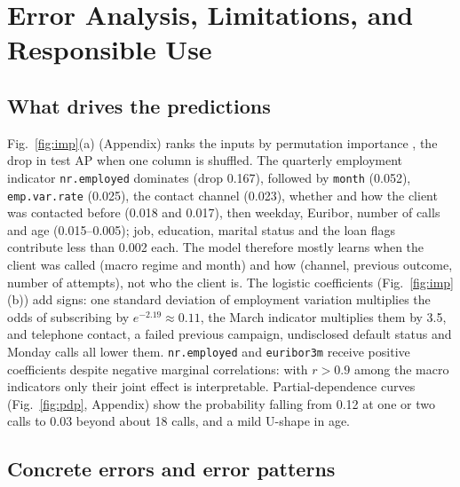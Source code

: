 \documentclass[conference]{IEEEtran}
\begin{document}
\section{Error Analysis, Limitations, and Responsible Use}
\subsection{What drives the predictions}
Fig.~\ref{fig:imp}(a) (Appendix) ranks the inputs by permutation importance \cite{breiman2001}, the drop in test AP when one column is shuffled. The quarterly employment indicator \texttt{nr.employed} dominates (drop 0.167), followed by \texttt{month} (0.052), \texttt{emp.var.rate} (0.025), the contact channel (0.023), whether and how the client was contacted before (0.018 and 0.017), then weekday, Euribor, number of calls and age (0.015--0.005); job, education, marital status and the loan flags contribute less than 0.002 each. The model therefore mostly learns when the client was called (macro regime and month) and how (channel, previous outcome, number of attempts), not who the client is. The logistic coefficients (Fig.~\ref{fig:imp}(b)) add signs: one standard deviation of employment variation multiplies the odds of subscribing by $e^{-2.19}\approx0.11$, the March indicator multiplies them by 3.5, and telephone contact, a failed previous campaign, undisclosed default status and Monday calls all lower them. \texttt{nr.employed} and \texttt{euribor3m} receive positive coefficients despite negative marginal correlations: with $r>0.9$ among the macro indicators only their joint effect is interpretable. Partial-dependence curves \cite{friedman2001} (Fig.~\ref{fig:pdp}, Appendix) show the probability falling from 0.12 at one or two calls to 0.03 beyond about 18 calls, and a mild U-shape in age.

\subsection{Concrete errors and error patterns}
\begin{table}[t]
\caption{Most confident correct decisions (TP: called and subscribed; TN: not called, did not subscribe) and mistakes (FN: subscribed, not called; FP: called, did not subscribe) of the calibrated GB rule on the test set; ``prob.'' is the calibrated probability.}
\label{tab:examples}
\centering\scriptsize
\setlength{\tabcolsep}{3pt}
\resizebox{\columnwidth}{!}{}
\end{table}
\end{document}

